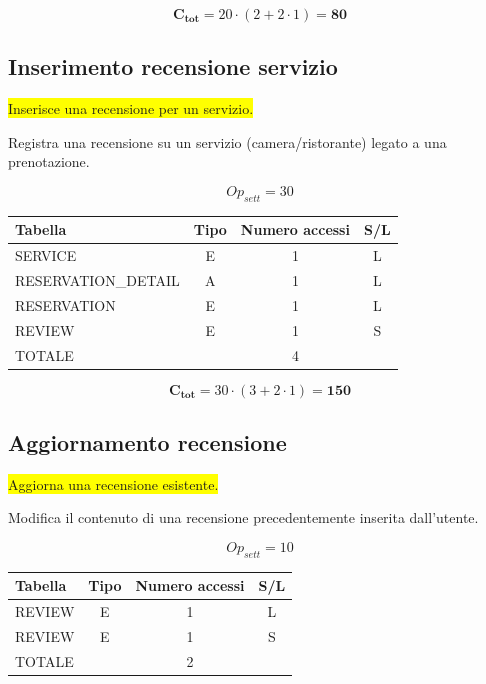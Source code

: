 \documentclass[a4paper,12pt]{report}
\begin{document}
$$\mathbf{C_{tot}} = 20 \cdot (2 + 2 \cdot 1) = \mathbf{80}$$

\subsection*{Inserimento recensione servizio} \label{op10}
\colorbox{yellow}{Inserisce una recensione per un servizio.}

Registra una recensione su un servizio (camera/ristorante) legato a
una prenotazione.

$$Op_{sett} = 30$$

\begin{table}[H]
  \centering
  \small
  \renewcommand{\arraystretch}{1.15}
  \begin{tabularx}{0.8\textwidth}{|X|c|c|c|}
    \hline
    \rowcolor{gray!20}
    \textbf{Tabella} & \textbf{Tipo} & \textbf{Numero accessi} & \textbf{S/L} \\
    \hline
    SERVICE & E & 1 & L \\
    RESERVATION\_DETAIL & A & 1 & L \\
    RESERVATION & E & 1 & L \\
    REVIEW & E & 1 & S \\
    \hline
    \rowcolor{gray!20}
    TOTALE & & 4 & \\
    \hline
  \end{tabularx}
  \vspace{-1em}
\end{table}

$$\mathbf{C_{tot}} = 30 \cdot (3 + 2 \cdot 1) = \mathbf{150}$$

\subsection*{Aggiornamento recensione} \label{op11}
\colorbox{yellow}{Aggiorna una recensione esistente.}

Modifica il contenuto di una recensione precedentemente inserita dall'utente.

$$Op_{sett} = 10$$

\begin{table}[H]
  \centering
  \small
  \renewcommand{\arraystretch}{1.15}
  \begin{tabularx}{0.8\textwidth}{|X|c|c|c|}
    \hline
    \rowcolor{gray!20}
    \textbf{Tabella} & \textbf{Tipo} & \textbf{Numero accessi} & \textbf{S/L} \\
    \hline
    REVIEW & E & 1 & L \\
    REVIEW & E & 1 & S \\
    \hline
    \rowcolor{gray!20}
    TOTALE & & 2 & \\
    \hline
  \end{tabularx}
  \vspace{-1em}
\end{table}
\end{document}
